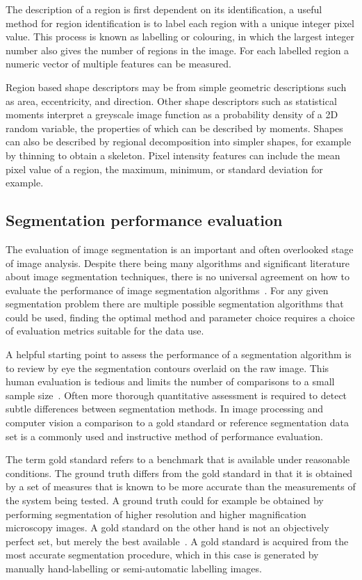 The description of a region is first dependent on its identification, a useful method for region identification is to label each region with a unique integer pixel value. This process is known as labelling or colouring, in which the largest integer number also gives the number of regions in the image. For each labelled region a numeric vector of multiple features can be measured.

Region based shape descriptors may be from simple geometric descriptions such as area, eccentricity, and direction. Other shape descriptors such as statistical moments interpret a greyscale image function as a probability density of a 2D random variable, the properties of which can be described by moments. Shapes can also be described by regional decomposition into simpler shapes, for example by thinning to obtain a skeleton. Pixel intensity features can include the mean pixel value of a region, the maximum, minimum, or standard deviation for example.

\subsection{Segmentation performance evaluation}
\label{introduction:image_processing:performance_evaluation}
The evaluation of image segmentation is an important and often overlooked stage of image analysis. Despite there being many algorithms and significant literature about image segmentation techniques, there is no universal agreement on how to evaluate the performance of image segmentation algorithms~\cite{Benes2015}. For any given segmentation problem there are multiple possible segmentation algorithms that could be used, finding the optimal method and parameter choice requires a choice of evaluation metrics suitable for the data use.

A helpful starting point to assess the performance of a segmentation algorithm is to review by eye the segmentation contours overlaid on the raw image. This human evaluation is tedious and limits the number of comparisons to a small sample size~\cite{Zhang2008}. Often more thorough quantitative assessment is required to detect subtle differences between segmentation methods. In image processing and computer vision a comparison to a gold standard or reference segmentation data set is a commonly used and instructive method of performance evaluation.

The term gold standard refers to a benchmark that is available under reasonable conditions. The ground truth differs from the gold standard in that it is obtained by a set of measures that is known to be more accurate than the measurements of the system being tested. A ground truth could for example be obtained by performing segmentation of higher resolution and higher magnification microscopy images. A gold standard on the other hand is not an objectively perfect set, but merely the best available~\cite{Cardoso2014}. A gold standard is acquired from the most accurate segmentation procedure, which in this case is generated by manually hand-labelling or semi-automatic labelling images.


